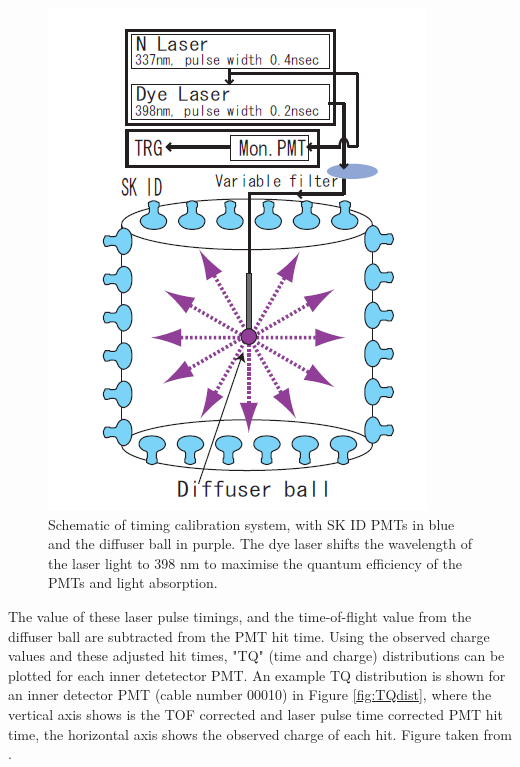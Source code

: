 \begin{figure}
    \includegraphics[width=\textwidth]{Figures/timecalibsystem.png}
\caption{Schematic of timing calibration system, with SK ID PMTs in blue and the diffuser ball in purple. The dye laser shifts the wavelength of the laser light to 398 nm to maximise the quantum efficiency of the PMTs and light absorption.}
    \label{fig:timecalibsystem}
\end{figure}


The value of these laser pulse timings, and the time-of-flight value from the diffuser ball are subtracted from the PMT hit time. Using the observed charge values and these adjusted hit times, "TQ" (time and charge) distributions can be plotted for each inner detetector PMT. An example TQ distribution is shown for an inner detector PMT (cable number 00010) in Figure \ref{fig:TQdist}, where the vertical axis shows is the TOF corrected and laser pulse time corrected PMT hit time, the horizontal axis shows the observed charge of each hit. Figure taken from \cite{abe_calibration_2014}. 

